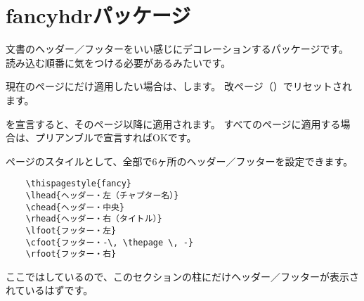 \section{fancyhdrパッケージ}

\thispagestyle{fancy}
\cfoot{-\, \thepage \, -}

文書のヘッダー／フッターをいい感じにデコレーションするパッケージです。
読み込む順番に気をつける必要があるみたいです。

現在のページにだけ適用したい場合は、\texttt{\thispagestyle{fancy}}します。
改ページ（\texttt{\newpage}）でリセットされます。

\texttt{\pagestyle{fancy}}を宣言すると、そのページ以降に適用されます。
すべてのページに適用する場合は、プリアンブルで宣言すればOKです。

ページのスタイルとして、全部で6ヶ所のヘッダー／フッターを設定できます。

\begin{verbatim}
    \thispagestyle{fancy}
    \lhead{ヘッダー・左（チャプター名）}
    \chead{ヘッダー・中央}
    \rhead{ヘッダー・右（タイトル）}
    \lfoot{フッター・左}
    \cfoot{フッター・-\, \thepage \, -}
    \rfoot{フッター・右}
\end{verbatim}


ここでは\texttt{\thispagestyle{fancy}}しているので、このセクションの柱にだけヘッダー／フッターが表示されているはずです。
